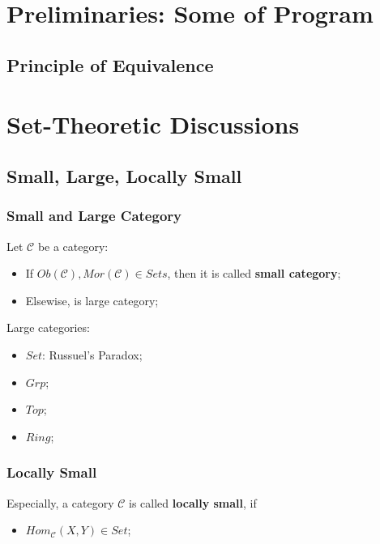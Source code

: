 \documentclass[Total.tex]{subfiles}
\begin{document}
	\chapter{Preliminaries: Some of Program}
		\section{Principle of Equivalence}
	\chapter{Set-Theoretic Discussions}
		\section{Small, Large, Locally Small}
			\subsection{Small and Large Category}
				\begin{Def}
					Let $\mathcal{C}$ be a category:
					\begin{itemize}
						\item If $Ob(\mathcal{C}),Mor(\mathcal{C})\in Sets$, then it is called \textbf{small category};
						\item Elsewise, is large category;
					\end{itemize}
				\end{Def}
				
				\begin{example}
					
					Large categories:
					\begin{itemize}
						\item $Set$: Russuel's Paradox;
						\item $Grp$;
						\item $Top$;
						\item $Ring$;
					\end{itemize}
				\end{example}
			\subsection{Locally Small}
				\begin{Def}
					Especially, a category $\mathcal{C}$ is called \textbf{locally small}, if
					\begin{itemize}
						\item $Hom_\mathcal{C}(X,Y)\in Set$;
					\end{itemize}
				\end{Def}
\end{document}
